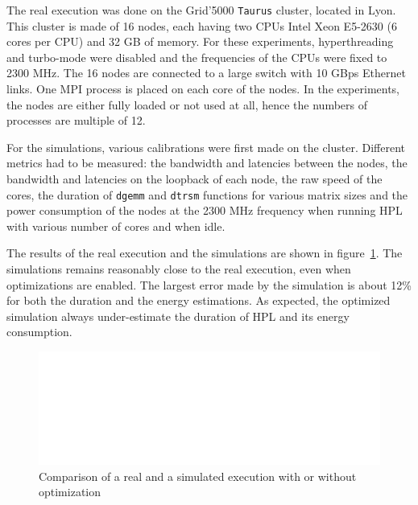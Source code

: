 \documentclass[12pt, a4paper]{memoir}
\begin{document}
The real execution was done on the Grid'5000 \texttt{Taurus} cluster, located in Lyon. This cluster is made of 16 nodes, each
having two CPUs Intel Xeon E5-2630 (6 cores per CPU) and 32 GB of memory. For these experiments, hyperthreading and
turbo-mode were disabled and the frequencies of the CPUs were fixed to 2300 MHz. The 16 nodes are connected to a large
switch with 10 GBps Ethernet links. One MPI process is placed on each core of the nodes. In the experiments, the
nodes are either fully loaded or not used at all, hence the numbers of processes are multiple of 12.

For the simulations, various calibrations were first made on the cluster. Different metrics had to be measured: the
bandwidth and latencies between the nodes, the bandwidth and latencies on the loopback of each node, the raw speed of
the cores, the duration of \texttt{dgemm} and \texttt{dtrsm} functions for various matrix sizes and the power consumption of the nodes
at the 2300 MHz frequency when running HPL with various number of cores and when idle.

The results of the real execution and the simulations are shown in figure~\ref{fig:comparison_real}.  The simulations
remains reasonably close to the real execution, even when optimizations are enabled. The largest error made by the
simulation is about 12\% for both the duration and the energy estimations. As expected, the optimized simulation always
under-estimate the duration of HPL and its energy consumption.

\begin{figure}[htpb]
\centering
\includegraphics[width=\linewidth, page=2]{../hpl_analysis/taurus/validation.pdf}
\caption{Comparison of a real and a simulated execution with or without optimization}
\label{fig:comparison_real}
\end{figure}
\end{document}
